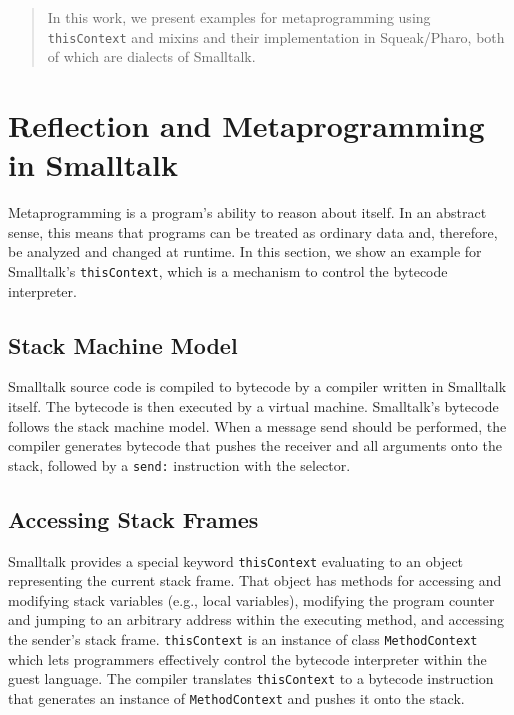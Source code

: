 \documentclass[12pt]{article}
\begin{document}
\begin{abstract}
In this work, we present examples for metaprogramming using \texttt{thisContext} and mixins and their implementation in Squeak/Pharo, both of which are dialects of Smalltalk.
\end{abstract}

\section{Reflection and Metaprogramming in Smalltalk}
Metaprogramming is a program's ability to reason about itself. In an abstract sense, this means that programs can be treated as ordinary data and, therefore, be analyzed and changed at runtime. In this section, we show an example for Smalltalk's \texttt{thisContext}, which is a mechanism to control the bytecode interpreter.

\subsection{Stack Machine Model}
Smalltalk source code is compiled to bytecode by a compiler written in Smalltalk itself. The bytecode is then executed by a virtual machine. Smalltalk's bytecode follows the stack machine model. When a message send should be performed, the compiler generates bytecode that pushes the receiver and all arguments onto the stack, followed by a \texttt{send:} instruction with the selector. 

\subsection{Accessing Stack Frames}
Smalltalk provides a special keyword \texttt{thisContext} evaluating to an object representing the current stack frame. That object has methods for accessing and modifying stack variables (e.g., local variables), modifying the program counter and jumping to an arbitrary address within the executing method, and accessing the sender's stack frame. \texttt{thisContext} is an instance of class \texttt{MethodContext} which lets programmers effectively control the bytecode interpreter within the guest language. The compiler translates \texttt{thisContext} to a bytecode instruction that generates an instance of \texttt{MethodContext} and pushes it onto the stack.
\end{document}
